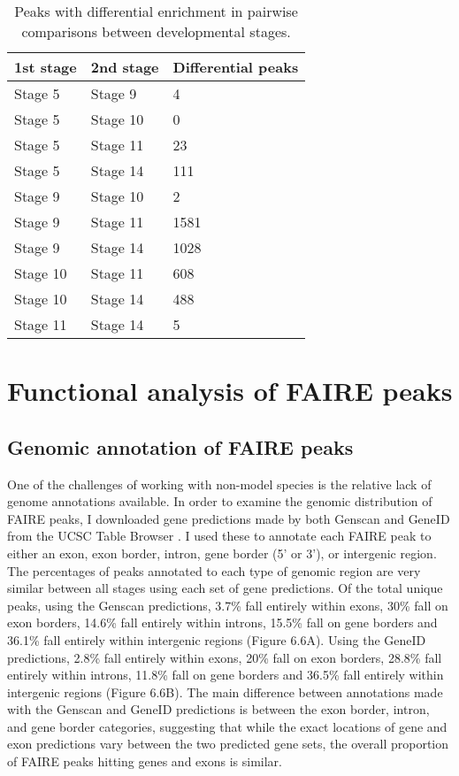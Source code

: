 \begin{table}[h]
\centering
\begin{tabular}{|l|l|l|}
\hline
\textbf{1st stage} & \textbf{2nd stage} & \textbf{Differential peaks} \\ \hline
Stage 5   & Stage 9   & 4                  \\ \hline
Stage 5   & Stage 10  & 0                  \\ \hline
Stage 5   & Stage 11  & 23                 \\ \hline
Stage 5   & Stage 14  & 111                \\ \hline
Stage 9   & Stage 10  & 2                  \\ \hline
Stage 9   & Stage 11  & 1581               \\ \hline
Stage 9   & Stage 14  & 1028               \\ \hline
Stage 10  & Stage 11  & 608                \\ \hline
Stage 10  & Stage 14  & 488                \\ \hline
Stage 11  & Stage 14  & 5                  \\ \hline
\end{tabular}
\caption{Peaks with differential enrichment in pairwise comparisons between developmental stages.}
\label{Table 6.3}
\end{table}

\section{Functional analysis of FAIRE peaks}
\subsection{Genomic annotation of FAIRE peaks}
One of the challenges of working with non-model species is the relative lack of genome annotations available. In order to examine the genomic distribution of FAIRE peaks, I downloaded gene predictions made by both Genscan and GeneID from the UCSC Table Browser \citep{burge_prediction_1997,karolchik_ucsc_2004, karolchik_ucsc_2014,parra_geneid_2000}. I used these to annotate each FAIRE peak to either an exon, exon border, intron, gene border (5’ or 3’), or intergenic region. The percentages of peaks annotated to each type of genomic region are very similar between all stages using each set of gene predictions. Of the total unique peaks, using the Genscan predictions, 3.7\% fall entirely within exons, 30\% fall on exon borders, 14.6\% fall entirely within introns, 15.5\% fall on gene borders and 36.1\% fall entirely within intergenic regions (Figure 6.6A). Using the GeneID predictions, 2.8\% fall entirely within exons, 20\% fall on exon borders, 28.8\% fall entirely within introns, 11.8\% fall on gene borders and 36.5\% fall entirely within intergenic regions (Figure 6.6B). The main difference between annotations made with the Genscan and GeneID predictions is between the exon border, intron, and gene border categories, suggesting that while the exact locations of gene and exon predictions vary between the two predicted gene sets, the overall proportion of FAIRE peaks hitting genes and exons is similar.

